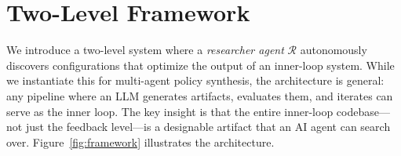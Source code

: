 \documentclass[sigconf,authordraft]{acmart}
\newcommand{\cR}{\mathcal{R}}
\begin{document}
\section{Two-Level Framework}

We introduce a two-level system where a \emph{researcher agent} $\cR$ autonomously discovers configurations that optimize the output of an inner-loop system. While we instantiate this for multi-agent policy synthesis, the architecture is general: any pipeline where an LLM generates artifacts, evaluates them, and iterates can serve as the inner loop. The key insight is that the entire inner-loop codebase---not just the feedback level---is a designable artifact that an AI agent can search over. Figure~\ref{fig:framework} illustrates the architecture.
\end{document}

